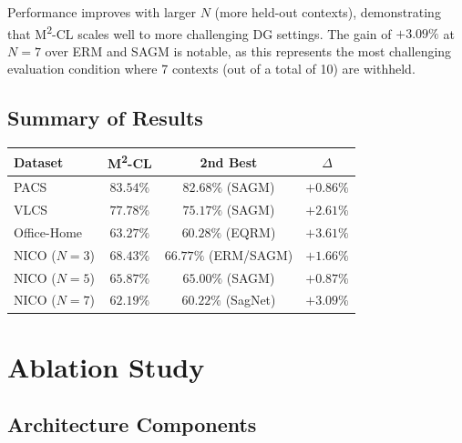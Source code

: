\documentclass[12pt,a4paper]{article}
\newcommand{\good}[1]{\textcolor{GreenOK}{\textbf{#1}}}
\begin{document}
Performance improves with larger $N$ (more held-out contexts), demonstrating that
M\textsuperscript{2}-CL scales well to more challenging DG settings. The gain of $+3.09\%$
at $N{=}7$ over ERM and SAGM is notable, as this represents the most challenging evaluation
condition where 7 contexts (out of a total of 10) are withheld.

\subsection{Summary of Results}

\begin{tcolorbox}[result={M\textsuperscript{2}-CL: Summary of improvements over second-best baseline}]
  \centering
  \begin{tabular}{@{}lccc@{}}
    \toprule
    \textbf{Dataset} & \textbf{M\textsuperscript{2}-CL} & \textbf{2nd Best} & \textbf{$\Delta$} \\
    \midrule
    PACS        & $83.54\%$ & $82.68\%$ (SAGM)   & \good{$+0.86\%$} \\
    VLCS        & $77.78\%$ & $75.17\%$ (SAGM)   & \good{$+2.61\%$} \\
    Office-Home & $63.27\%$ & $60.28\%$ (EQRM)   & \good{$+3.61\%$} \\
    NICO ($N{=}3$) & $68.43\%$ & $66.77\%$ (ERM/SAGM) & \good{$+1.66\%$} \\
    NICO ($N{=}5$) & $65.87\%$ & $65.00\%$ (SAGM) & \good{$+0.87\%$} \\
    NICO ($N{=}7$) & $62.19\%$ & $60.22\%$ (SagNet) & \good{$+3.09\%$} \\
    \bottomrule
  \end{tabular}
\end{tcolorbox}

\section{Ablation Study}
\label{sec:ablation}

\subsection{Architecture Components}
\end{document}
